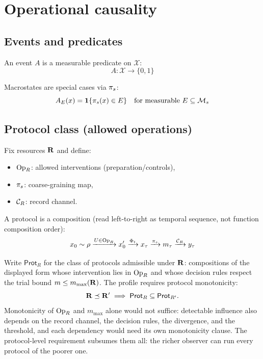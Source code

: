 \section{Operational causality}\label{sec:operational-causality}

\subsection{Events and predicates}

An event $A$ is a measurable predicate on $\mathcal{X}$:
\begin{equation}
  A : \mathcal{X} \to \{0, 1\}\label{eq:event}
\end{equation}

Macrostates are special cases via $\pi_s$:
\begin{equation}
  A_E(x) = \mathbf{1}\{ \pi_s(x) \in E \}
  \quad \text{for measurable } E \subseteq \mathcal{M}_s\label{eq:macro-event}
\end{equation}

\subsection{Protocol class (allowed operations)}

Fix resources $\mathbf{R}$ and define:
\begin{itemize}
  \item $\mathrm{Op}_{R}$: allowed interventions (preparation/controls),
  \item $\pi_s$: coarse-graining map,
  \item $\mathcal{C}_R$: record channel.
\end{itemize}

A protocol is a composition (read left-to-right as temporal sequence, not
function composition order):
\begin{equation}
  x_0 \sim \rho
  \xrightarrow{U \in \mathrm{Op}_{R}} x_0'
  \xrightarrow{\Phi_t} x_\tau
  \xrightarrow{\pi_s} m_\tau
  \xrightarrow{\mathcal{C}_R} y_\tau\label{eq:protocol}
\end{equation}

Write $\mathsf{Prot}_R$ for the class of protocols admissible under
$\mathbf{R}$: compositions of the displayed form whose intervention
lies in $\mathrm{Op}_{R}$ and whose decision rules respect the trial bound
$m \le m_{\max}(\mathbf{R})$.  The profile requires protocol
monotonicity:
\begin{equation}
  \mathbf{R} \preceq \mathbf{R}'
  \implies
  \mathsf{Prot}_R \subseteq \mathsf{Prot}_{R'}.\label{eq:protocol-monotone}
\end{equation}
Monotonicity of $\mathrm{Op}_{R}$ and $m_{\max}$ alone would not suffice:
detectable influence also depends on the record channel, the decision
rules, the divergence, and the threshold, and each dependency would
need its own monotonicity clause.  The protocol-level requirement
subsumes them all: the richer observer can run every protocol of the
poorer one.

